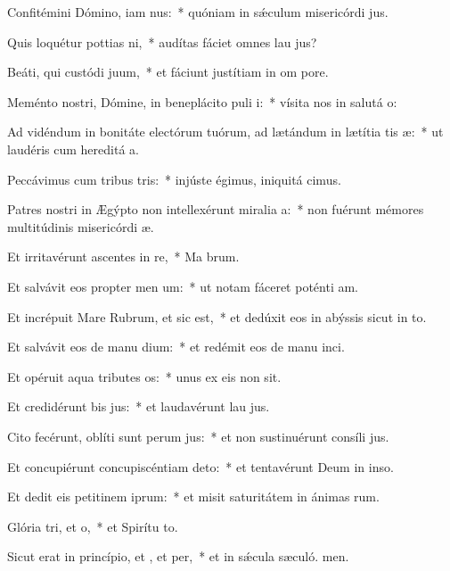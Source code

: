 \item Confitémini Dómino, iam nus:~* quóniam in sǽculum misericórdi jus.
\item Quis loquétur pottias ni,~* audítas fáciet omnes lau jus?
\item Beáti, qui custódi juum,~* et fáciunt justítiam in om pore.
\item Meménto nostri, Dómine, in beneplácito puli i:~* vísita nos in salutá o:
\item Ad vidéndum in bonitáte electórum tuórum, ad lætándum in lætítia tis æ:~* ut laudéris cum hereditá a.
\item Peccávimus cum tribus tris:~* injúste égimus, iniquitá cimus.
\item Patres nostri in Ægýpto non intellexérunt miralia a:~* non fuérunt mémores multitúdinis misericórdi æ.
\item Et irritavérunt ascentes in re,~* Ma brum.
\item Et salvávit eos propter men um:~* ut notam fáceret poténti am.
\item Et incrépuit Mare Rubrum, et sic est,~* et dedúxit eos in abýssis sicut in to.
\item Et salvávit eos de manu dium:~* et redémit eos de manu inci.
\item Et opéruit aqua tributes os:~* unus ex eis non sit.
\item Et credidérunt bis jus:~* et laudavérunt lau jus.
\item Cito fecérunt, oblíti sunt perum jus:~* et non sustinuérunt consíli jus.
\item Et concupiérunt concupiscéntiam  deto:~* et tentavérunt Deum in inso.
\item Et dedit eis petitinem iprum:~* et misit saturitátem in ánimas rum.
\item Glória tri, et o,~* et Spirítu to.
\item Sicut erat in princípio, et , et per,~* et in sǽcula sæculó. men.
